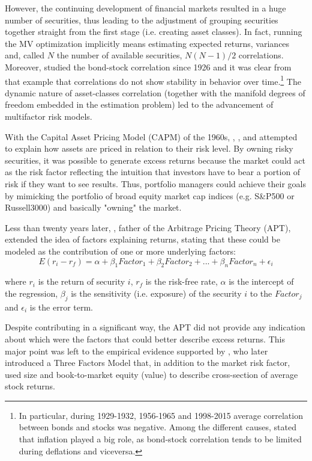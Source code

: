\documentclass[12pt]{article}
\begin{document}
However, the continuing development of financial markets resulted in a huge number of securities, thus leading to the adjustment of grouping securities together straight from the first stage (i.e. creating asset classes). In fact, running the MV optimization implicitly means estimating expected returns, variances and, called $N$ the number of available securities, $N (N-1) / 2$ correlations. Moreover,  studied the bond-stock correlation since 1926 and it was clear from that example that correlations do not show stability in behavior over time.\footnote{In particular, during 1929-1932, 1956-1965 and 1998-2015 average correlation between bonds and stocks was negative. Among the different causes,  stated that inflation played a big role, as bond-stock correlation tends to be limited during deflations and viceversa.} The dynamic nature of asset-classes correlation (together with the manifold degrees of freedom embedded in the estimation problem) led to the advancement of multifactor risk models.

With the Capital Asset Pricing Model (CAPM) of the 1960s, , ,  and  attempted to explain how assets are priced in relation to their risk level. By owning risky securities, it was possible to generate excess returns because the market could act as the risk factor reflecting the intuition that investors have to bear a portion of risk if they want to see results. Thus, portfolio managers could achieve their goals by mimicking the portfolio of broad equity market cap indices (e.g. S\&P500 or Russell3000) and basically "owning" the market.

Less than twenty years later, , father of the Arbitrage Pricing Theory (APT), extended the idea of factors explaining returns, stating that these could be modeled as the contribution of one or more underlying factors:
\begin{equation} \label{equation1}
E(r_i - r_f) = \alpha+\beta_1 Factor_1+\beta_2 Factor_2+...+\beta_n Factor_n+\epsilon_i
\end{equation}

where $r_i$ is the return of security $i$, $r_f$ is the risk-free rate, $\alpha$ is the intercept of the regression, $\beta_j$ is the sensitivity (i.e. exposure) of the security $i$ to the $Factor_j$ and $\epsilon_i$ is the error term.

Despite contributing in a significant way, the APT did not provide any indication about which were the factors that could better describe excess returns. This major point was left to the empirical evidence supported by , who later introduced a Three Factors Model that, in addition to the market risk factor, used size and book-to-market equity (value) to describe cross-section of average stock returns.
\end{document}
